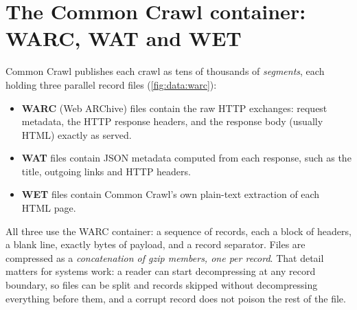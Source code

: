 \section{The Common Crawl container: WARC, WAT and WET}\label{sec:data:warc}

Common Crawl publishes each crawl as tens of thousands of \emph{segments}, each holding three
parallel record files (\cref{fig:data:warc}):

\begin{itemize}
  \item \textbf{WARC} (Web ARChive) files contain the raw HTTP exchanges: request metadata, the
        HTTP response headers, and the response body (usually HTML) exactly as served.
  \item \textbf{WAT} files contain JSON metadata computed from each response, such as the title, outgoing links and
        HTTP headers.
  \item \textbf{WET} files contain Common Crawl's own plain-text extraction of each HTML page.
\end{itemize}

All three use the WARC container: a sequence of records, each a block of  headers,
a blank line, exactly  bytes of payload, and a record separator. Files are
compressed as a \emph{concatenation of gzip members, one per record}. That detail matters for
systems work: a reader can start decompressing at any record boundary, so files can be split and
records skipped without decompressing everything before them, and a corrupt record does not
poison the rest of the file.

